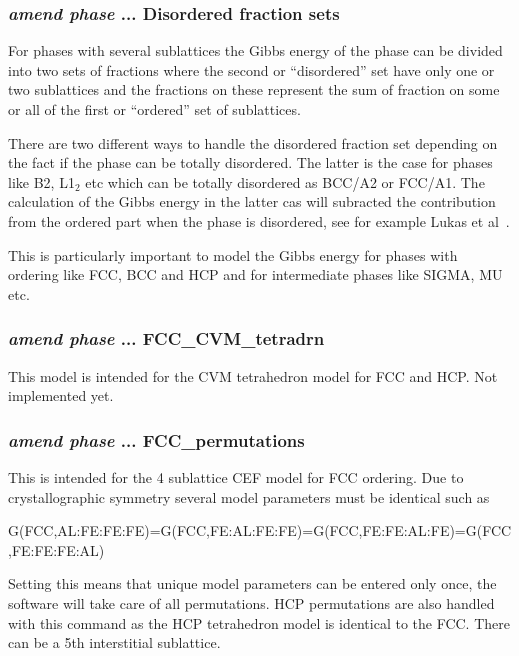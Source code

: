 \documentclass[11pt]{article}
\begin{document}
\hypertarget{Amend phase disordfrac}{}
\subsubsection{{\em amend phase} ... Disordered fraction sets}

For phases with several sublattices the Gibbs energy of the phase can
be divided into two sets of fractions where the second or
``disordered'' set have only one or two sublattices and the fractions
on these represent the sum of fraction on some or all of the first or
``ordered'' set of sublattices.

There are two different ways to handle the disordered fraction set
depending on the fact if the phase can be totally disordered.  The
latter is the case for phases like B2, L1$_2$ etc which can be totally
disordered as BCC/A2 or FCC/A1.  The calculation of the Gibbs energy
in the latter cas will subracted the contribution from the ordered
part when the phase is disordered, see for example Lukas et
al~\cite{07Luk}.

This is particularly important to model the Gibbs energy for phases
with ordering like FCC, BCC and HCP and for intermediate phases like
SIGMA, MU etc.

\hypertarget{Amend FCC-CVM-tetradrn}{}
\subsubsection{{\em amend phase} ... FCC\_CVM\_tetradrn}

This model is intended for the CVM tetrahedron model for FCC and HCP.
Not implemented yet.

\hypertarget{Amend FCC-permutations}{}
\subsubsection{{\em amend phase} ... FCC\_permutations}

This is intended for the 4 sublattice CEF model for FCC ordering.  Due
to crystallographic symmetry several model parameters must be
identical such as

G(FCC,AL:FE:FE:FE)=G(FCC,FE:AL:FE:FE)=G(FCC,FE:FE:AL:FE)=G(FCC,FE:FE:FE:AL)

Setting this means that unique model parameters can be entered only
once, the software will take care of all permutations.  HCP
permutations are also handled with this command as the HCP tetrahedron
model is identical to the FCC.  There can be a 5th interstitial
sublattice.
\end{document}
